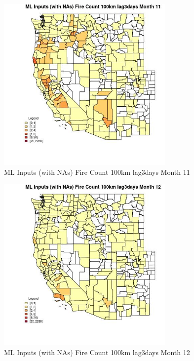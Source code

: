 \begin{figure} 
\centering  
\includegraphics[width=0.77\textwidth]{Code_Outputs/Report_ML_input_PM25_Step4_part_e_de_duplicated_aves_compiled_2019-05-20wNAs_CountyFire_Count_100km_lag3daysmedianMonth11.jpg} 
\caption{\label{fig:Report_ML_input_PM25_Step4_part_e_de_duplicated_aves_compiled_2019-05-20wNAsCountyFire_Count_100km_lag3daysmedianMonth11}ML Inputs (with NAs) Fire Count 100km lag3days Month 11} 
\end{figure} 
 

\begin{figure} 
\centering  
\includegraphics[width=0.77\textwidth]{Code_Outputs/Report_ML_input_PM25_Step4_part_e_de_duplicated_aves_compiled_2019-05-20wNAs_CountyFire_Count_100km_lag3daysmedianMonth12.jpg} 
\caption{\label{fig:Report_ML_input_PM25_Step4_part_e_de_duplicated_aves_compiled_2019-05-20wNAsCountyFire_Count_100km_lag3daysmedianMonth12}ML Inputs (with NAs) Fire Count 100km lag3days Month 12} 
\end{figure} 
 

